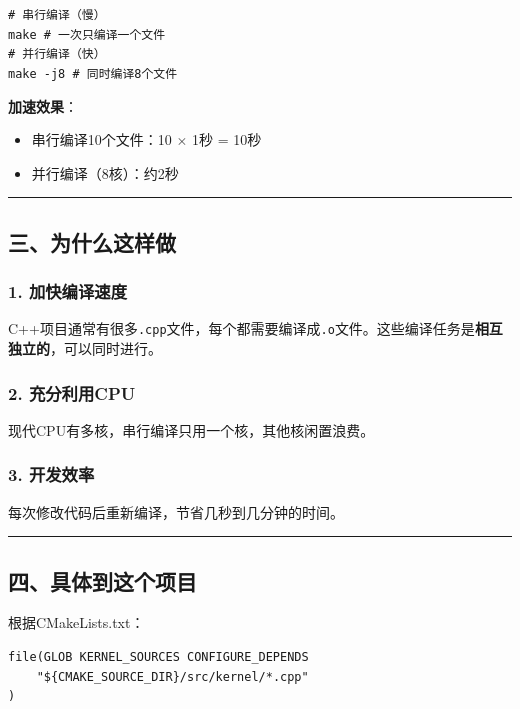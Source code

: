 \documentclass[11pt, a4paper]{article}
\begin{document}
\begin{aibox}
\begin{tcolorbox}[colback=white,colframe=gray!50!white,boxrule=0.5pt,arc=2pt,left=5pt,right=5pt,top=5pt,bottom=5pt]
\texttt{\# 串行编译（慢）}\\
\texttt{make          \# 一次只编译一个文件}\\[0.5em]
\texttt{\# 并行编译（快）}\\
\texttt{make -j8      \# 同时编译8个文件}
\end{tcolorbox}

\textbf{加速效果}：
\begin{itemize}
    \item 串行编译10个文件：10 $\times$ 1秒 = 10秒
    \item 并行编译（8核）：约2秒
\end{itemize}

\begin{center}\rule{\textwidth}{0.4pt}\end{center}

\subsection*{三、为什么这样做}

\subsubsection*{1. 加快编译速度}
C++项目通常有很多\texttt{.cpp}文件，每个都需要编译成\texttt{.o}文件。这些编译任务是\textbf{相互独立的}，可以同时进行。

\subsubsection*{2. 充分利用CPU}
现代CPU有多核，串行编译只用一个核，其他核闲置浪费。

\subsubsection*{3. 开发效率}
每次修改代码后重新编译，节省几秒到几分钟的时间。

\begin{center}\rule{\textwidth}{0.4pt}\end{center}

\subsection*{四、具体到这个项目}

根据CMakeLists.txt：
\begin{tcolorbox}[colback=white,colframe=gray!50!white,boxrule=0.5pt,arc=2pt,left=5pt,right=5pt,top=5pt,bottom=5pt]
\begin{verbatim}
file(GLOB KERNEL_SOURCES CONFIGURE_DEPENDS
    "${CMAKE_SOURCE_DIR}/src/kernel/*.cpp"
)
\end{verbatim}
\end{tcolorbox}


\end{aibox}
\end{document}
